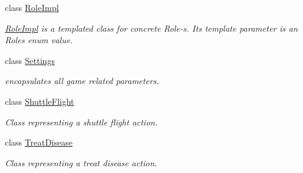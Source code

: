\begin{DoxyCompactItemize}
class \hyperlink{classpan_1_1_role_impl}{Role\+Impl}
\begin{DoxyCompactList}\small\item\em \hyperlink{classpan_1_1_role_impl}{Role\+Impl} is a templated class for concrete Role-\/s. Its template parameter is an Roles enum value. \end{DoxyCompactList}\item 
class \hyperlink{classpan_1_1_settings}{Settings}
\begin{DoxyCompactList}\small\item\em encapsulates all game related parameters. \end{DoxyCompactList}\item 
class \hyperlink{classpan_1_1_shuttle_flight}{Shuttle\+Flight}
\begin{DoxyCompactList}\small\item\em Class representing a shuttle flight action. \end{DoxyCompactList}\item 
class \hyperlink{classpan_1_1_treat_disease}{Treat\+Disease}
\begin{DoxyCompactList}\small\item\em Class representing a treat disease action. \end{DoxyCompactList}\end{DoxyCompactItemize}
